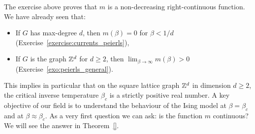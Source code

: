 \begin{remark}
    The exercise above proves that $m$ is a non-decreasing right-continuous function.
    We have already seen that:
    \begin{itemize}
        \item If $G$ has max-degree $d$,
        then $m(\beta)=0$ for $\beta<1/d$ (Exercise~\ref{exercise:currents_peierls}),
        \item If $G$ is the graph $\mathbb Z^d$ for $d\geq 2$,
        then $\lim_{\beta\to\infty}m(\beta)>0$ (Exercise~\ref{exo:peierls_general}).
    \end{itemize}
    This implies in particular that on the square lattice graph $\mathbb Z^d$ in dimension
    $d\geq 2$,
    the critical inverse temperature $\beta_c$ is a strictly positive real number.
    A key objective of our field is to understand the behaviour of the Ising model
    at $\beta=\beta_c$ and at $\beta\approx\beta_c$.
    As a very first question we can ask:
    is the function $m$ continuous?
    We will see the answer in Theorem~\ref{}.
\end{remark}
